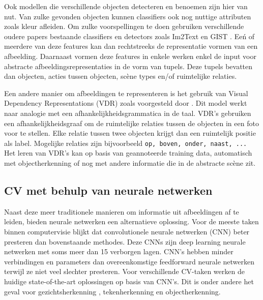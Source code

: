 Ook modellen die verschillende objecten detecteren en benoemen zijn hier van nut. Van zulke gevonden objecten kunnen classifiers ook nog nuttige attributen zoals kleur afleiden. Om zulke voorspellingen te doen gebruiken verschillende oudere papers bestaande classifiers en detectors zoals \cite{Felzenszwalb2008} Im2Text \cite{Ordonez2011} en GIST \cite{Oliva2006}. Ee\'n of meerdere van deze features kan dan rechtstreeks de representatie vormen van een afbeelding. Daarnaast vormen deze features in enkele werken \cite{Farhadi2010,Yang2011,Li2011,Mitchell2012} enkel de input voor abstracte afbeeldingsrepresentaties in de vorm van tupels. Deze tupels bevatten dan objecten, acties tussen objecten, sc\`ene types en/of ruimtelijke relaties.

Een andere manier om afbeeldingen te representeren is het gebruik van Visual Dependency Representations (VDR) zoals voorgesteld door \cite{Elliott2013}. Dit model werkt naar analogie met een afhankelijkheidsgrammatica in de taal. VDR's gebruiken een afhankelijkheidsgraaf om de ruimtelijke relaties tussen de objecten in een foto voor te stellen. Elke relatie tussen twee objecten krijgt dan een ruimtelijk positie als label. Mogelijke relaties zijn bijvoorbeeld \texttt{op, boven, onder, naast, ...} Het leren van VDR's kan op basis van geannoteerde training data, automatisch met objectherkenning \cite{Elliott2015} of nog met andere informatie die in de abstracte sc\`ene zit. \cite{Gilberto2015} 

\subsection{CV met behulp van neurale netwerken}
Naast deze meer traditionele manieren om informatie uit afbeeldingen af te leiden, bieden neurale netwerken een alternatieve oplossing.
Voor de meeste taken binnen computervisie blijkt dat convolutionele neurale netwerken (CNN) beter presteren dan bovenstaande methodes. Deze CNNs zijn deep learning neurale netwerken met soms meer dan 15 verborgen lagen. CNN's hebben minder verbindingen en parameters dan overeenkomstige feedforward neurale netwerken terwijl ze niet veel slechter presteren.\cite{Krizhevsky2012a} 
Voor verschillende CV-taken werken de huidige state-of-the-art oplossingen op basis van CNN's. Dit is onder andere het geval voor gezichtsherkenning \cite{Zhou2015}, tekenherkenning \cite{Ciresan2012} en objectherkenning\cite{Szegedy2014}.

